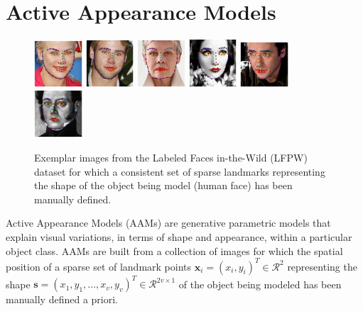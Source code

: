 \section{Active Appearance Models}
\label{sec:aam}

\begin{figure}
	\centering
	\includegraphics[width=0.16\textwidth]{figures/img0.png}
	\includegraphics[width=0.16\textwidth]{figures/img1.png}
	\includegraphics[width=0.16\textwidth]{figures/img2.png}
	\includegraphics[width=0.16\textwidth]{figures/img3.png}
	\includegraphics[width=0.16\textwidth]{figures/img4.png}
	\includegraphics[width=0.16\textwidth]{figures/img5.png}
	\caption{Exemplar images from the Labeled Faces in-the-Wild (LFPW) dataset \cite{Belhumeur2011} for which a consistent set of sparse landmarks representing the shape of the object being model (human face) has been manually defined.}
	\label{fig:lfpw_images}
\end{figure}

Active Appearance Models (AAMs) \cite{Cootes2001,Matthews2004} are generative parametric models that explain visual variations, in terms of shape and appearance, within a particular object class. AAMs are built from a collection of images for which the spatial position of a sparse set of landmark points $\mathbf{x}_i = (x_i, y_i)^T \in \mathcal{R}^2$ representing the shape $\mathbf{s} = (x_1, y_1, \dots, x_v, y_v)^T \in \mathcal{R}^{2v \times 1}$ of the object being modeled has been manually defined a priori. 

